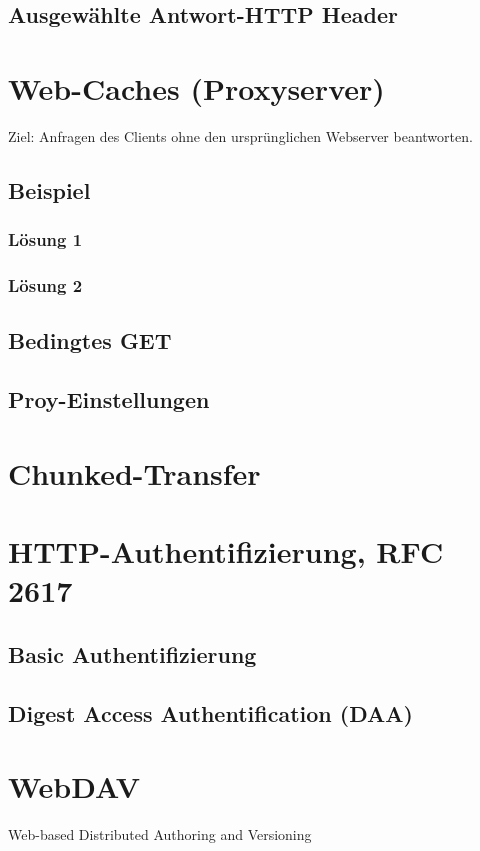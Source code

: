 \subsection{Ausgewählte Antwort-HTTP Header}
\section{Web-Caches (Proxyserver)}
Ziel: Anfragen des Clients ohne den ursprünglichen Webserver beantworten.
\subsection{Beispiel}
\subsubsection{Lösung 1}
\subsubsection{Lösung 2}
\subsection{Bedingtes GET}
\subsection{Proy-Einstellungen}
\section{Chunked-Transfer}
\section{HTTP-Authentifizierung, RFC 2617}
\subsection{Basic Authentifizierung}
\subsection{Digest Access Authentification (DAA)}
\section{WebDAV}
Web-based Distributed Authoring and Versioning
